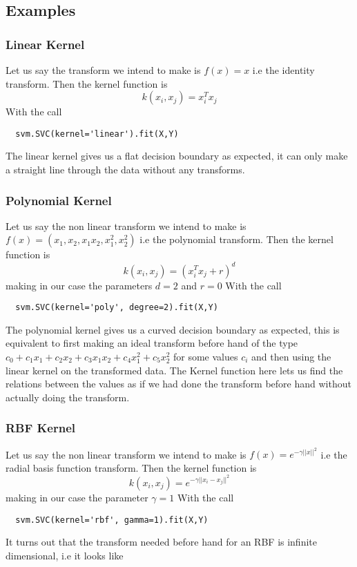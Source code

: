 \documentclass[hidelinks]{book}
\numberwithin{equation}{section}
\begin{document}
\subsection{Examples}
  \subsubsection{Linear Kernel}
  Let us say the transform we intend to make is $f(x) = x$ i.e the identity
  transform. Then the kernel function is
  $$ k(x_i, x_j) = x_i^T x_j $$ With the call
  \begin{verbatim}
  svm.SVC(kernel='linear').fit(X,Y)
  \end{verbatim}
  The linear kernel gives us a flat decision boundary as expected, it can only
  make a straight line through the data without any transforms.

  \subsubsection{Polynomial Kernel}
  Let us say the non linear transform we intend to make is $f(x) = (x_1, x_2,
  x_1x_2, x_1^2 ,x_2^2)$ i.e the polynomial transform. Then the kernel function
  is $$k(x_i, x_j) = (x_i^T x_j + r)^d $$ making in our case the parameters
  $d = 2$ and $r = 0$ With the call
  \begin{verbatim}
  svm.SVC(kernel='poly', degree=2).fit(X,Y)
  \end{verbatim}
  The polynomial kernel gives us a curved decision boundary as expected, this
  is equivalent to first making an ideal transform before hand of the type
  $c_0 + c_1x_1 + c_2x_2 + c_3x_1x_2 + c_4x_1^2 + c_5x_2^2$ for some values
  $c_i$ and then using the linear kernel on the transformed data. The Kernel
  function here lets us find the relations between the values as if we had
  done the transform before hand without actually doing the transform.

  \subsubsection{RBF Kernel}
  Let us say the non linear transform we intend to make is $f(x) = e^{-\gamma
  ||x||^2}$ i.e the radial basis function transform. Then the kernel function
  is $$k(x_i, x_j) = e^{-\gamma ||x_i - x_j||^2} $$ making in our case the
  parameter $\gamma = 1$ With the call
  \begin{verbatim}
  svm.SVC(kernel='rbf', gamma=1).fit(X,Y)
  \end{verbatim}
  It turns out that the transform needed before hand for an RBF is infinite
  dimensional, i.e it looks like
\end{document}
